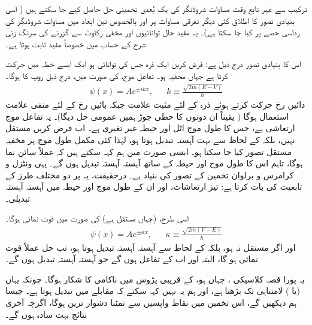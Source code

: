 

 ترکیب سے غیر تابع وقت مساوات شروڈنگر کی یک بُعدی تخمینی حل حاصل کیے جا سکتے ہیں ( اسی بنیادی تصور کا اطلاق کئی دیگر تفرقی مساوات پر اور بالخصوص تین ابعاد میں مساوات شروڈنگر کی رداسی حصے پر کیا جا سکتا ہے)۔ یہ مقید حال توانائیوں اور مخفی رکاوٹ سے گزرنے کی سرنگ زنی شرح کے حساب میں خصوصاً مفید ثابت ہوتا ہے۔

اس کا بنیادی تصور درج ذیل ہے: فرض کریں ایک ذرہ جس کی توانائی  ہو ایک ایسے خطہ میں حرکت کرتا ہے جہاں مخفیہ   ہو۔ تفاعل موج،  کی صورت میں، درج ذیل روپ کا ہوگا۔
\begin{align*}
	\psi(x)=Ae^{\pm ikx}, && k\equiv\frac{\sqrt{2m(E-V)}}{\hslash} 
\end{align*}
دائیں رخ حرکت کرتے ہوئے ذرہ کے لئے مثبت علامت جبکہ بائیں رخ کے لئے منفی علامت استعمال ہوگا ( یقیناً ان دونوں کا خطی جوڑ ہمیں عمومی حل دیگا)۔ یہ تفاعل موج ارتعاشی ہے، جس کا طول موج  اٹل اور حیطہ  غیر تغیری ہے۔ اب فرض کریں  مستقل نہیں، بلکہ  کے لحاظ سے بہت آہستہ تبدیل ہوتا ہو، لہٰذا کئی مکمل طول موج پر مخفیہ مستقل تصور کیا جا سکتا ہو۔ ایسی صورت میں ہم کہہ سکتے ہیں کہ  عملاً سائن نما ہوگا، تاہم اس کا طول موج اور حیطہ  کے ساتھ آہستہ آہستہ تبدیل ہوں گے۔ یہی ونٹزل و کرامرس و برلوان تخمین کے تصور کی بنیاد ہے۔ درحقیقت، یہ  پر دو مختلف طرز کے تابعیت کی بات کرتا ہے: تیز ارتعاشات، اور ان کے طول موج اور حیطہ میں آہستہ آہستہ تبدیلی۔

اسی طرح،  (جہاں  مستقل ہے) کی صورت میں  قوت نمائی ہوگا۔
\begin{align*}
	\psi(x)=Ae^{\pm\kappa x},&& \kappa \equiv\frac{\sqrt{2m(V-E)}}{\hslash} 
\end{align*}
اور اگر  مستقل نہ ہو، بلکہ  کے لحاظ سے آہستہ آہستہ تبدیل ہوتا ہو، تب حل عملاً قوت نمائی ہو گا، البتہ  اور  اب  کے تفاعل ہوں گے جو آہستہ آہستہ تبدیل ہوں گے۔ 

یہ پورا قصہ کلاسیکی ، جہاں  ہو، کے قریبی پڑوس میں ناکامی کا شکار ہوگا۔ چونکہ یہاں  (یا ) لامتناہی تک بڑھتا ہے، اور ہم یہ نہیں کہہ سکتے کہ  مقابلے میں  تبدیل ہوتا ہے۔ جیسا ہم دیکھیں گے، اس تخمین میں نقاط واپسیں سے نمٹنا دشوار ترین ہوگا، اگرچہ آخری نتائج بہت سادہ ہوں گے۔

